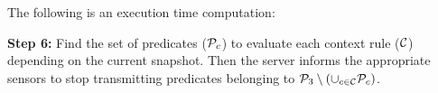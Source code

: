  
 \begin{comment}
 
\begin{boxedalgorithmic}[1] 
\Procedure{UnateAnalysis}{${\cal{P}}_1, {\cal{P}}_3, {\cal{C}}$}\\
{ Input:  (${\cal{P}}_1, {\cal{P}}_3, {\cal{C}}=\{{\cal{C}}_1,{\cal{C}}_2,\ldots,{\cal{C}}_k\}$)}
 \For{$c \in {\cal{C}}$}
  \For{$p \in {\cal{P}}_1 \cup {\cal{P}}_3$ such that $\partial{c}/\partial{p} \neq 1$} 
    \If{$c$ is positive unate in $p$}
      \State put $p$ in $Pos_c$ 
    \ElsIf{$c$ is negative unate in $p$} 
      \State put $p$ in $Neg_c$
    \EndIf
  \EndFor
 \EndFor
\EndProcedure
\end{boxedalgorithmic}   
\label{algo4}
\\
\\\end{comment}
\vspace{2 mm}
\noindent
The following is an execution time computation:

\vspace{2 mm}
\noindent
{\bf{Step 6:}} Find the set of predicates (${\cal{P}}_c$) to evaluate each context rule (${{\cal{C}}}$) 
 		depending on the current snapshot. Then the server
	    informs the appropriate sensors to stop transmitting predicates 
	    belonging to ${\cal{P}}_3 \setminus (\cup _{c \in {\cal{C}}}{{\cal{P}}_c})$.




